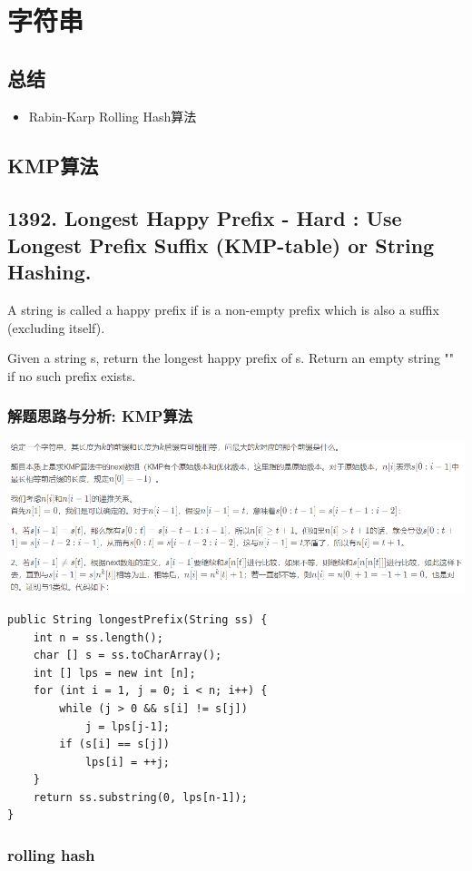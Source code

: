 \documentclass[9pt, b5paaper]{book}
\begin{document}
\chapter{字符串}
\label{sec-6}
\section{总结}
\label{sec-6-1}
\begin{itemize}
\item Rabin-Karp Rolling Hash算法
\end{itemize}
\section{KMP算法}
\label{sec-6-2}
\section{1392. Longest Happy Prefix  - Hard : Use Longest Prefix Suffix (KMP-table) or String Hashing.}
\label{sec-6-3}
A string is called a happy prefix if is a non-empty prefix which is also a suffix (excluding itself).

Given a string s, return the longest happy prefix of s. Return an empty string "" if no such prefix exists.
\subsection{解题思路与分析: KMP算法}
\label{sec-6-3-1}

\includegraphics[width=.9\linewidth]{./pic/happyString.png}

\begin{verbatim}
public String longestPrefix(String ss) {
    int n = ss.length();
    char [] s = ss.toCharArray();
    int [] lps = new int [n];
    for (int i = 1, j = 0; i < n; i++) {
        while (j > 0 && s[i] != s[j])
            j = lps[j-1];
        if (s[i] == s[j])
            lps[i] = ++j;
    }
    return ss.substring(0, lps[n-1]);
}
\end{verbatim}
\subsection{rolling hash}
\label{sec-6-3-2}
\end{document}
